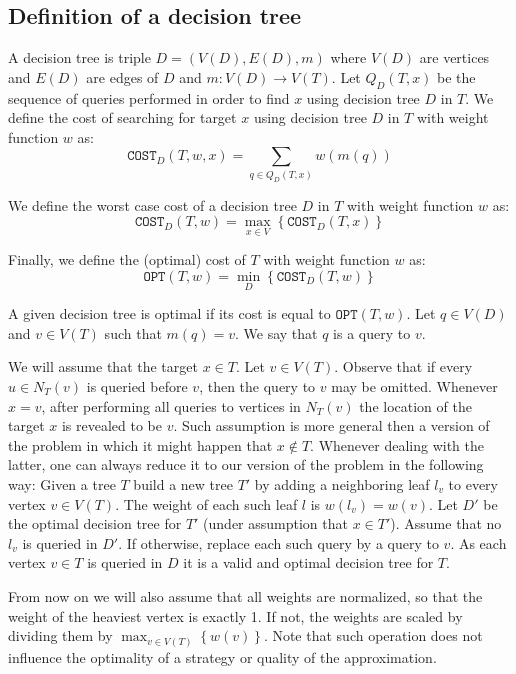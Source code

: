 \documentclass[a4paper, anonymous, numberwithinsect, pdfa, UKenglish,cleveref, autoref, thm-restate]{socg-lipics-v2021}
\newcommand{\br}[1]{\left( #1 \right)}
\newcommand{\brc}[1]{\left\{ #1 \right\}}
\newcommand{\OPT}{\texttt{OPT}}
\newcommand{\COST}{\texttt{COST}}
\begin{document}
\subsection{Definition of a decision tree}\label{definitionOfDecisionTree}
\begin{definition}
A decision tree is triple $D=(V\br{D}, E\br{D}, m)$ where $V\br{D}$ are vertices and $E\br{D}$ are edges of $D$ and $m: V\br{D} \to V\br{T}$. Let $Q_D\br{T,x}$ be the sequence of queries performed in order to find $x$ using decision tree $D$ in $T$. We define the cost of searching for target $x$ using decision tree $D$ in $T$ with weight function $w$ as:
$$
\COST_D\br{T, w, x} = \sum_{q\in Q_{D}\br{T,x}}w\br{m\br{q}}
$$

We define the worst case cost of a decision tree $D$ in $T$ with weight function $w$ as:
$$
\COST_D\br{T, w} = \max_{x\in V} \brc{\COST_D\br{T, x}}
$$

Finally, we define the (optimal) cost of $T$ with weight function $w$ as:
$$
\OPT(T, w) = \min_{D} \brc{\COST_D\br{T, w}}
$$
\end{definition}

A given decision tree is optimal if its cost is equal to $\OPT(T, w)$. Let $q\in V\br{D}$ and $v\in V\br{T}$ such that $m\br{q}=v$. We say that $q$ is a query to $v$.

\begin{remark}
We will assume that the target $x\in T$. Let $v\in V\br{T}$. Observe that if every $u\in N_T\br{v}$ is queried before $v$, then the query to $v$ may be omitted. Whenever $x=v$, after performing all queries to vertices in $N_T\br{v}$ the location of the target $x$ is revealed to be $v$.
Such assumption is more general then a version of the problem in which it might happen that $x\notin T$. Whenever dealing with the latter, one can always reduce it to our version of the problem in the following way: Given a tree $T$ build a new tree $T'$ by adding a neighboring leaf $l_v$ to every vertex $v\in V\br{T}$. The weight of each such leaf $l$ is $w\br{l_v}=w\br{v}$. Let $D'$ be the optimal decision tree for $T'$ (under assumption that $x\in T'$). Assume that no $l_v$ is queried in $D'$. If otherwise, replace each such query by a query to $v$. As each vertex $v\in T$ is queried in $D$ it is a valid and optimal decision tree for $T$.    
\end{remark}

From now on we will also assume that all weights are normalized, so that the weight of the heaviest vertex is exactly 1. If not, the weights are scaled by dividing them by $\max_{v\in V\br{T}}\brc{w(v)}$. Note that such operation does not influence the optimality of a strategy or quality of the approximation. 
\end{document}
